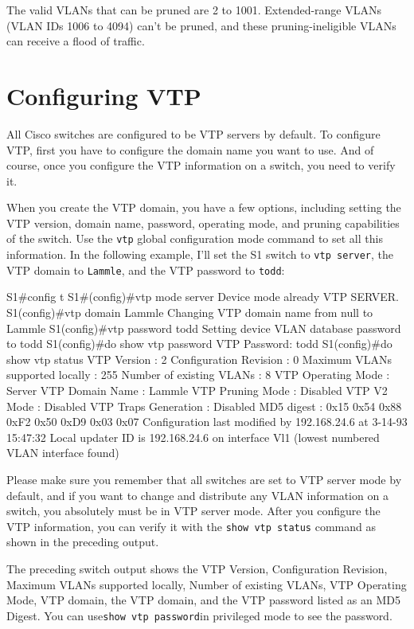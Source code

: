 The valid VLANs that can be pruned are 2 to 1001. Extended-range VLANs
(VLAN IDs 1006 to 4094) can't be pruned, and these pruning-ineligible
VLANs can receive a flood of traffic.

\section{Configuring VTP}

All Cisco switches are configured to be VTP servers by default. To
configure VTP, first you have to configure the domain name you want to
use. And of course, once you configure the VTP information on a switch,
you need to verify it.

When you create the VTP domain, you have a few options, including
setting the VTP version, domain name, password, operating mode, and
pruning capabilities of the switch. Use the \texttt{vtp} global
configuration mode command to set all this information. In the following
example, I'll set the S1 switch to \texttt{vtp\ server}, the VTP domain
to \texttt{Lammle}, and the VTP password to \texttt{todd}:

\begin{cli}
S1#config t
S1#(config)#vtp mode server
Device mode already VTP SERVER.
S1(config)#vtp domain Lammle
Changing VTP domain name from null to Lammle
S1(config)#vtp password todd
Setting device VLAN database password to todd
S1(config)#do show vtp password
VTP Password: todd
S1(config)#do show vtp status
VTP Version                     : 2
Configuration Revision          : 0
Maximum VLANs supported locally : 255
Number of existing VLANs        : 8
VTP Operating Mode              : Server
VTP Domain Name                 : Lammle
VTP Pruning Mode                : Disabled
VTP V2 Mode                     : Disabled
VTP Traps Generation            : Disabled
MD5 digest                      : 0x15 0x54 0x88 0xF2 0x50 0xD9 0x03 0x07
Configuration last modified by 192.168.24.6 at 3-14-93 15:47:32
Local updater ID is 192.168.24.6 on interface Vl1 (lowest numbered VLAN interface found)
\end{cli}

Please make sure you remember that all switches are set to VTP server
mode by default, and if you want to change and distribute any VLAN
information on a switch, you absolutely must be in VTP server mode.
After you configure the VTP information, you can verify it with the
\texttt{show\ vtp\ status} command as shown in the preceding output.

The preceding switch output shows the VTP Version, Configuration
Revision, Maximum VLANs supported locally, Number of existing VLANs, VTP
Operating Mode, VTP domain, the VTP domain, and the VTP password listed
as an MD5 Digest. You can use\texttt{show\ vtp\ password}in privileged
mode to see the password.


